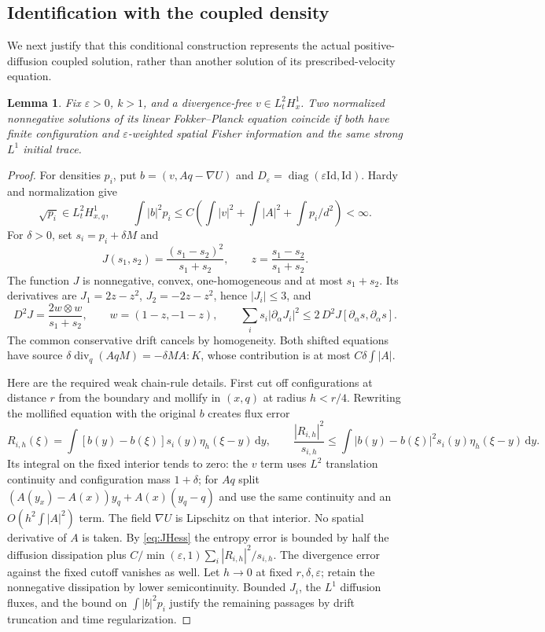 \documentclass[11pt]{article}
\numberwithin{equation}{section}
\newtheorem{lemma}[theorem]{Lemma}
\newcommand{\dd}{\,\mathrm d}
\newcommand{\Div}{\operatorname{div}}
\newcommand{\grad}{\nabla}
\newcommand{\Id}{\mathrm{Id}}
\begin{document}
\subsection{Identification with the coupled density}\label{subsec:identification}
We next justify that this conditional construction represents the actual
positive-diffusion coupled solution, rather than another solution of its
prescribed-velocity equation.

\begin{lemma}\label{lem:unique}
Fix $\varepsilon>0$, $k>1$, and a divergence-free $v\in L^2_tH^1_x$.
Two normalized nonnegative solutions of its linear Fokker--Planck equation
coincide if both have finite configuration and $\varepsilon$-weighted spatial
Fisher information and the same strong $L^1$ initial trace.
\end{lemma}
\begin{proof}
For densities $p_i$, put $b=(v,Aq-\grad U)$ and
$D_\varepsilon=\operatorname{diag}(\varepsilon\Id,\Id)$.
Hardy and normalization give
\[
 \sqrt{p_i}\in L^2_tH^1_{x,q},\qquad
 \int |b|^2p_i\leq C\left(\int|v|^2+\int|A|^2+
                              \int p_i/d^2\right)<\infty.
\]
For $\delta>0$, set $s_i=p_i+\delta M$ and
\[
 J(s_1,s_2)=\frac{(s_1-s_2)^2}{s_1+s_2},\qquad
 z=\frac{s_1-s_2}{s_1+s_2}.
\]
The function $J$ is nonnegative, convex, one-homogeneous and at most
$s_1+s_2$. Its derivatives are $J_1=2z-z^2$, $J_2=-2z-z^2$, hence
$|J_i|\leq3$, and
\begin{equation}\label{eq:JHess}
 D^2J=\frac{2w\otimes w}{s_1+s_2},\qquad w=(1-z,-1-z),\qquad
 \sum_i s_i|\partial_\alpha J_i|^2\leq
 2\,D^2J[\partial_\alpha s,\partial_\alpha s].
\end{equation}
The common conservative drift cancels by homogeneity. Both shifted equations
have source $\delta\Div_q(AqM)=-\delta M A:K$, whose contribution is at most
$C\delta\int|A|$.

Here are the required weak chain-rule details. First cut off configurations
at distance $r$ from the boundary and mollify in $(x,q)$ at radius $h<r/4$.
Rewriting the mollified equation with the original $b$ creates flux error
\[
 R_{i,h}(\xi)=\int[b(y)-b(\xi)]s_i(y)\eta_h(\xi-y)\dd y,\qquad
 \frac{|R_{i,h}|^2}{s_{i,h}}
 \leq\int|b(y)-b(\xi)|^2s_i(y)\eta_h(\xi-y)\dd y.
\]
Its integral on the fixed interior tends to zero: the $v$ term uses $L^2$
translation continuity and configuration mass $1+\delta$; for $Aq$ split
$(A(y_x)-A(x))y_q+A(x)(y_q-q)$ and use the same continuity and an
$O(h^2\int|A|^2)$ term. The field $\grad U$ is Lipschitz on that interior.
No spatial derivative of $A$ is taken. By \eqref{eq:JHess} the entropy error
is bounded by half the diffusion dissipation plus
$C/\min(\varepsilon,1)\sum_i|R_{i,h}|^2/s_{i,h}$.
The divergence error against the fixed cutoff vanishes as well.
Let $h\to0$ at fixed $r,\delta,\varepsilon$; retain the nonnegative
dissipation by lower semicontinuity. Bounded $J_i$, the $L^1$ diffusion
fluxes, and the bound on $\int|b|^2p_i$ justify the remaining passages by
drift truncation and time regularization.


\end{proof}
\end{document}
